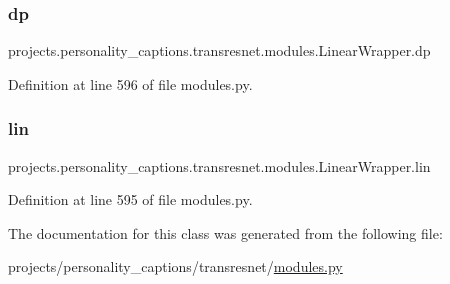 \subsubsection{\texorpdfstring{dp}{dp}}
{\footnotesize\ttfamily projects.\+personality\+\_\+captions.\+transresnet.\+modules.\+Linear\+Wrapper.\+dp}



Definition at line 596 of file modules.\+py.

\mbox{\label{classprojects_1_1personality__captions_1_1transresnet_1_1modules_1_1LinearWrapper_a8411866655bcc0a2d1f81872d690f0bd}} 
\subsubsection{\texorpdfstring{lin}{lin}}
{\footnotesize\ttfamily projects.\+personality\+\_\+captions.\+transresnet.\+modules.\+Linear\+Wrapper.\+lin}



Definition at line 595 of file modules.\+py.



The documentation for this class was generated from the following file\+:\begin{DoxyCompactItemize}
\item 
projects/personality\+\_\+captions/transresnet/\hyperlink{projects_2personality__captions_2transresnet_2modules_8py}{modules.\+py}\end{DoxyCompactItemize}
